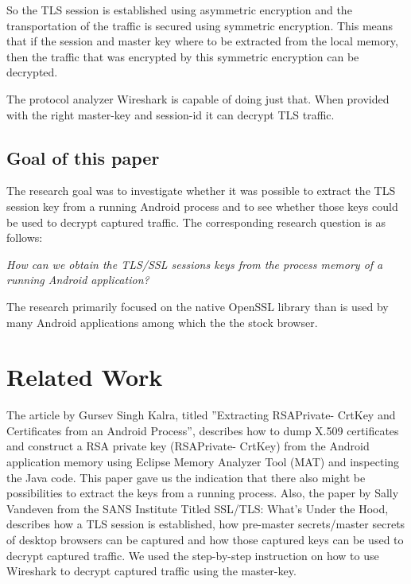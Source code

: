 \documentclass[12pt, a4paper]{report}
\begin{document}
\noindent So the TLS session is established using asymmetric encryption and the transportation of the traffic is secured using symmetric encryption. This means that if the session and master key where to be extracted from the local memory, then the traffic that was encrypted by this symmetric encryption can be decrypted. 

The protocol analyzer Wireshark is capable of doing just that. When provided with the right master-key and session-id it can decrypt TLS traffic.\cite{ref1,book1}

\section{Goal of this paper}

The research goal was to investigate whether it was possible to extract the TLS session key from a running Android process and to see whether those keys could be used to decrypt captured traffic. 
\newline
\noindent The corresponding research question is as follows:

\begin{framed}
\noindent \textit{How can we obtain the TLS/SSL sessions keys from the process memory of a running Android application?}
\end{framed}

\noindent The research primarily focused on the native OpenSSL library than is used by many Android applications among which the the stock browser.

\chapter{Related Work}
The article by Gursev Singh Kalra, titled ”Extracting RSAPrivate-
CrtKey and Certificates from an Android Process”, describes how to
dump X.509 certificates and construct a RSA private key (RSAPrivate-
CrtKey) from the Android application memory using Eclipse Memory
Analyzer Tool (MAT) and inspecting the Java code. This paper gave us the indication that there also might be possibilities to extract the keys from a running
process.\cite{ref1}
\newline
\newline
Also, the paper by Sally Vandeven from the SANS Institute Titled SSL/TLS: What's Under the Hood, describes how a TLS session is established, how pre-master secrets/master secrets of desktop browsers can be captured and how those captured keys can be used to decrypt captured traffic. We used the step-by-step instruction on how to use Wireshark to decrypt captured traffic using the master-key.\cite{ref2}
\end{document}

